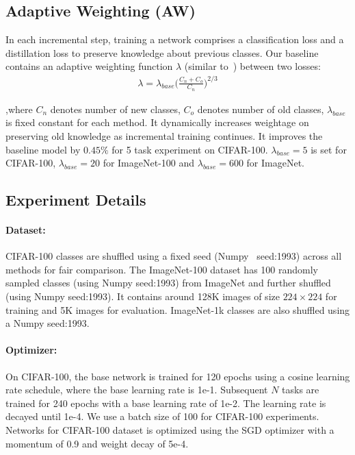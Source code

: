 \documentclass[final]{cvpr}
\begin{document}
\subsection{Adaptive Weighting (AW)}

In each incremental step, training a network comprises a classification loss and a distillation loss to preserve knowledge about previous classes. Our baseline contains an adaptive weighting function $\lambda$ (similar to~\cite{lucir}) between two losses:  
\begin{align}
   \lambda = \lambda_{base}\bigg(\frac{C_n+C_o}{C_n}\bigg)^{2/3} 
\end{align}

,where $C_n$ denotes number of new classes, $C_o$ denotes number of old classes, $\lambda_{base}$ is fixed constant for each method. It dynamically increases weightage on preserving old knowledge as incremental training continues. It improves the baseline model by $0.45\%$ for 5 task experiment on CIFAR-100. $\lambda_{base}=5$ is set for CIFAR-100, $\lambda_{base}=20$ for ImageNet-100 and $\lambda_{base}=600$ for ImageNet.  




\subsection{Experiment Details}

\paragraph{Dataset:}
CIFAR-100 classes are shuffled using a fixed seed (Numpy~\cite{5725236} seed:1993) across all methods for fair comparison.
The ImageNet-100 dataset has 100 randomly sampled classes (using Numpy seed:1993) from ImageNet and further shuffled (using Numpy seed:1993). It  contains around 128K images of size $224\times224$ for training and 5K images for evaluation. ImageNet-1k classes are also shuffled using a Numpy seed:1993. 

\paragraph{Optimizer:} On CIFAR-100, the base network is trained for 120 epochs using a cosine learning rate schedule, where the base learning rate is 1e-1. Subsequent $N$ tasks are trained for 240 epochs with a base learning rate of 1e-2.
The learning rate is decayed until 1e-4. We use a batch size of 100 for CIFAR-100 experiments.
Networks for CIFAR-100 dataset is optimized using the SGD optimizer with a momentum of 0.9 and weight decay of 5e-4. 
\end{document}
